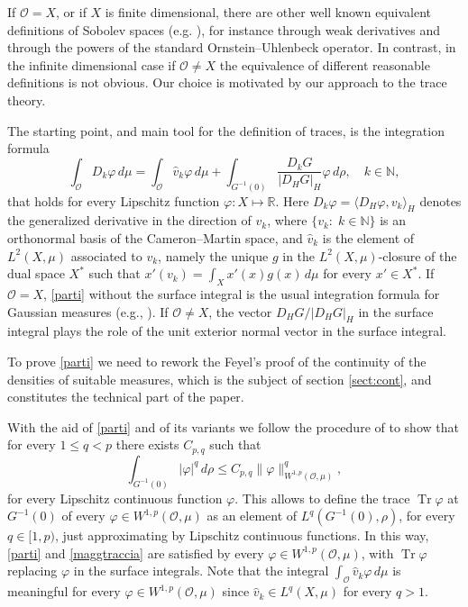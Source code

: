 \documentclass[reqno,twoside,12pt]{amsart}
\begin{document}
If ${\mathcal O} =X$, or if $X$ is finite dimensional,  there are other well known equivalent definitions of Sobolev spaces (e.g. \cite[Ch. 5]{Boga}), for instance through weak derivatives and through the powers of the standard Ornstein--Uhlenbeck operator.  In contrast, in the infinite dimensional case if ${\mathcal O} \neq X$ the equivalence of different reasonable definitions is not obvious. Our  choice is motivated by our approach to the trace theory. 

The starting point, and main tool for the definition of traces, is the integration formula
\begin{equation}
\label{parti}
\int_{\mathcal O} D_k\varphi \,d\mu =   \int_{\mathcal O} \hat{v}_k\varphi \,d\mu + \int_{G^{-1}(0)} \frac{D_k G}{|D_HG|_H }\varphi \,d\rho , \quad k\in {\mathbb N} ,
\end{equation}
that holds for every Lipschitz function $\varphi :X \mapsto {\mathbb R}$. 
Here $D_k\varphi= \langle D_H\varphi, v_k\rangle _H$ denotes the generalized derivative in the direction of $v_k$, where $\{v_k :\;k \in {\mathbb N}\}$ is an orthonormal basis of the Cameron--Martin space, and $ \hat{v}_k  $ is the element of $L^2(X, \mu)$ associated to $v_k$, namely the
unique  $g $ in the $L^2(X, \mu)$-closure of the dual space $X^*$   such that $x'(v_k) = \int_X x'(x)g(x)\,d\mu$ for every $x'\in X^*$.  If ${\mathcal O} = X$, \eqref{parti} without the surface integral is the usual integration formula for Gaussian measures (e.g., \cite[Ch. 5]{Boga}). If ${\mathcal O}\neq X$, the vector $D_HG/|D_HG|_H$ in the surface integral  plays the role of the unit exterior normal vector in the surface integral. 
  

To prove \eqref{parti} we need to rework the Feyel's proof of the continuity of the densities of suitable measures, which is the subject of section \ref{sect:cont}, and constitutes the technical part of the paper.  

With the aid of \eqref{parti} and of its variants we follow the procedure of \cite{DPL} to show that  for every $1\leq q<p$ there exists $C_{p,q}$ such that 
\begin{equation}
\label{maggtraccia}
\int_{G^{-1}(0)} | \varphi|^q   \,d\rho  \leq C_{p,q} \|\varphi\|_{ W^{1,p}({\mathcal O}, \mu)}^q ,
\end{equation}
for every Lipschitz continuous function $\varphi$. This allows to define the trace ${\operatorname{Tr}} \varphi$ at $G^{-1}(0)$ of every $\varphi \in W^{1,p}({\mathcal O}, \mu)$ as an element of $L^q(G^{-1}(0),  \rho)$, for every $q\in [1, p)$, just  approximating by Lipschitz continuous functions. In this way, \eqref{parti}  and \eqref{maggtraccia} are satisfied by every $\varphi \in W^{1,p}({\mathcal O}, \mu)$, with ${\operatorname{Tr}} \varphi$ replacing $\varphi$ in the surface integrals. Note that the integral $\int_{\mathcal O} \hat{v}_k\varphi\, d\mu$ is meaningful for every $\varphi\in  W^{1,p}({\mathcal O}, \mu)$ since $ \hat{v}_k\in L^q(X, \mu)$ for every $q>1$. 
\end{document}
